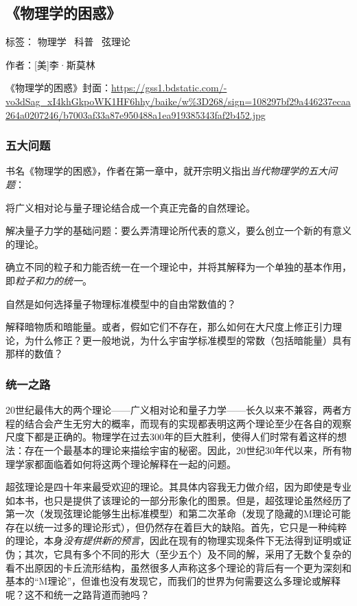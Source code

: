 \subsection{《物理学的困惑》}

标签： 物理学 \  科普  \ 弦理论

作者：[美]李·斯莫林

《物理学的困惑》封面：\url{https://gss1.bdstatic.com/-vo3dSag_xI4khGkpoWK1HF6hhy/baike/w\%3D268/sign=108297bf29a446237ecaa264a0207246/b7003af33a87e950488a1ea919385343faf2b452.jpg}

\subsubsection{五大问题}

书名《物理学的困惑》，作者在第一章中，就开宗明义指出\emph{当代物理学的五大问题}：
\begin{itemize*}
	\item 将广义相对论与量子理论结合成一个真正完备的自然理论。
	\item 解决量子力学的基础问题：要么弄清理论所代表的意义，要么创立一个新的有意义的理论。
	\item 确立不同的粒子和力能否统一在一个理论中，并将其解释为一个单独的基本作用，即\emph{粒子和力的统一}。
	\item 自然是如何选择量子物理标准模型中的自由常数值的？
	\item 解释暗物质和暗能量。或者，假如它们不存在，那么如何在大尺度上修正引力理论，为什么修正？更一般地说，为什么宇宙学标准模型的常数（包括暗能量）具有那样的数值？
\end{itemize*}

\subsubsection{统一之路}
20世纪最伟大的两个理论——广义相对论和量子力学——长久以来不兼容，两者方程的结合会产生无穷大的概率，而现有的实现都表明这两个理论至少在各自的观察尺度下都是正确的。物理学在过去300年的巨大胜利，使得人们时常有着这样的想法：存在一个最基本的理论来描绘宇宙的秘密。因此，20世纪30年代以来，所有物理学家都面临着如何将这两个理论解释在一起的问题。

超弦理论是四十年来最受欢迎的理论。其具体内容我无力做介绍，因为即使是专业如本书，也只是提供了该理论的一部分形象化的图景。但是，超弦理论虽然经历了第一次（发现弦理论能够生出标准模型）和第二次革命（发现了隐藏的M理论可能存在以统一过多的理论形式），但仍然存在着巨大的缺陷。首先，它只是一种纯粹的理论，本身\emph{没有提供新的预言}，因此在现有的物理实现条件下无法得到证明或证伪；其次，它具有多个不同的形大（至少五个）及不同的解，采用了无数个复杂的看不出原因的卡丘流形结构，虽然很多人声称这多个理论的背后有一个更为深刻和基本的“M理论”，但谁也没有发现它，而我们的世界为何需要这么多理论或解释呢？这不和统一之路背道而驰吗？

